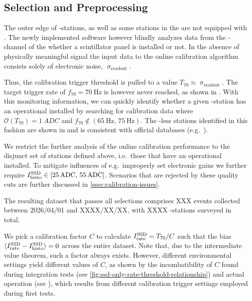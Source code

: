 \subsection{Selection and Preprocessing}
\label{ssec:ssd-online-calib-normalization-factor}

The outer edge of \SD-stations, as well as some stations in the  are not
equipped with \SSDs. The newly implemented software however blindly analyzes 
data from the \SSD-\PMT channel of the \UUB whether a scintillator panel is 
installed or not. In the absence of physically meaningful signal the input data 
to the online calibration algorithm consists solely of electronic noise, 
$\upsigma_\mathrm{readout}$. 

Thus, the calibration trigger threshold is pulled to a value 
$T_{70} \approx \upsigma_\mathrm{readout}$. The target trigger rate of 
$f_{70} = \SI{70}{\hertz}$ is however never reached, as shown in .
With this monitoring information, we can quickly identify whether a given 
\SD-station has an operational \SSD installed by searching for calibration data
where $\mathcal{O}(T_{70}) = \SI{1}{ADC}$ and 
$f_{70}\notin(\SI{65}{\hertz},\,\SI{75}{\hertz})$. The \SSD-less stations
identified in this fashion are shown in  and is consistent with 
official databases (e.g.~\cite{AugerMaps}).

We restrict the further analysis of the \SSD online calibration performance to
the disjunct set of stations defined above, i.e.~those that have an operational
\SSD installed. To mitigate influences of e.g.~improperly set electronic gains
we further require $I^\text{SSD}_\text{histo}\in[\SI{25}{ADC},\,\SI{55}{ADC}]$. Scenarios that
are rejected by these quality cuts are further discussed in 
\cref{ssec:calibration-issues}.
 
The resulting dataset that passes all selections comprises XXX \TTHREE events 
collected between 2026/04/01 and XXXX/XX/XX, with XXXX \SD-stations surveyed in 
total.

We pick a calibration factor $C$ to calculate $I^\text{SSD}_\text{rate} = T_{70} / C$ such 
that the bias $\langle I^\text{SSD}_\text{rate} - I^\text{SSD}_\text{histo}\rangle = 0$ across the entire 
dataset. Note that, due to the intermediate value theorem, such a factor always 
exists. However, different environmental settings yield different values of $C$,
as shown by the incombatibility of $C$ found during integration tests (see
\cref{fig:ssd-only-rate-threshold-relationship}) and actual operation (see 
), which results from different calibration trigger settings 
employed during first tests.

